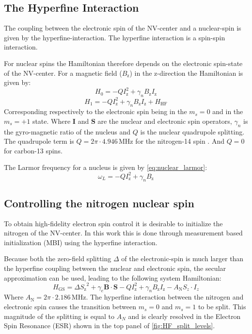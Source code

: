 \subsection{The Hyperfine Interaction}
The coupling between the electronic spin of the NV-center and a nuclear-spin is given by the hyperfine-interaction.
The hyperfine interaction is a spin-spin interaction.

For nuclear spins the Hamiltonian therefore depends on the electronic spin-state of the NV-center.
For a magnetic field ($B_\mathrm{z}$) in the z-direction the Hamiltonian is given by:
\begin{equation}
    \label{eq:nuclear_hamiltonian_0}
    H_0= -Q I_{\mathrm{z}}^2+ \gamma_{n} B_\mathrm{z} I_\mathrm{z}
\end{equation}
\begin{equation}
    \label{eq:nuclear_hamiltonian_1}
    H_1 = -Q I_{\mathrm{z}}^2+\gamma_{n} B_\mathrm{z} I_\mathrm{z} +H_{\mathrm{HF}}
\end{equation}
Corresponding respectively to the electronic spin being in the $m_s = 0$ and in the $m_s = +1$ state.
Where $\bm{I}$ and $\bm{S}$ are the nuclear and electronic spin operators, $\gamma_n$ is the gyro-magnetic ratio of the nucleus and $Q$ is the nuclear quadrupole splitting.
The quadrupole term is $Q= 2\pi \cdot 4.946 \,\mathrm{ MHz}$ for the nitrogen-14 spin \citep{Bernien2014Control}.
And $Q = 0$ for carbon-13 spins.


The Larmor frequency for a nucleus is given by  \cref{eq:nuclear_larmor}:
\begin{equation}
\label{eq:nuclear_larmor}
{\omega_L} =-Q{I}_{\mathrm{z}}^2+ \gamma_{n}B_\mathrm{z}
\end{equation}

\subsection{Controlling the nitrogen nuclear spin}
\label{sec:nitrogen_spin_control}
To obtain high-fidelity electron spin control it is desirable to initialize the nitrogen of the NV-center.
In this work this is done through measurement based initialization (MBI) using the hyperfine interaction.

Because both the zero-field splitting $\Delta$ of the electronic-spin is much larger than the hyperfine coupling between the nuclear and electronic spin, the secular approximation can be used, leading to the following system Hamiltonian:
\begin{equation}
        H_\mathrm{GS} = \Delta {{S}_\mathrm{z}}^2 + \gamma_e \bm{B} \cdot \bm{S} -Q I_{\mathrm{z}}^2+\gamma_{n} B_\mathrm{z} I_\mathrm{z} - A_\mathrm{N} S_z\cdot {I_z}
\end{equation}
Where $A_\mathrm{N} = 2\pi \cdot 2.186 \, \mathrm{MHz} $.
The hyperfine interaction between the nitrogen and electronic spin causes the transition between $m_s=0$ and $m_s =1$ to be split.
This magnitude of the splitting is equal to $A_N$ and  is clearly resolved in the Electron Spin Resonance (ESR) shown in the top panel of \cref{fig:HF_split_levels}.


